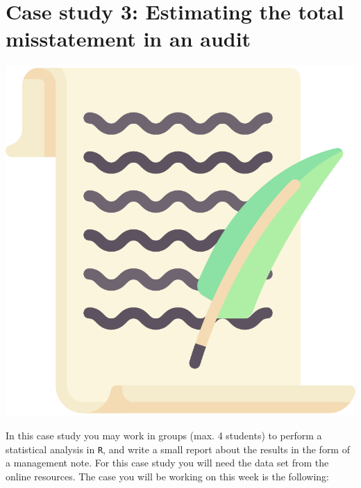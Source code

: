 
\begin{minipage}{0.8\textwidth}
\section{Case study 3: Estimating the total misstatement in an audit}
\end{minipage}%
\hfill%
\begin{minipage}{0.1\textwidth}
\includegraphics[width=\linewidth]{Files/Images/lettericon.pdf}
\end{minipage}
\vspace*{.1cm}

In this case study you may work in groups (max. 4 students) to perform a statistical analysis in \texttt{R}, and write a small report about the results in the form of a management note. For this case study you will need the data set  from the online resources. The case you will be working on this week is the following: \\

